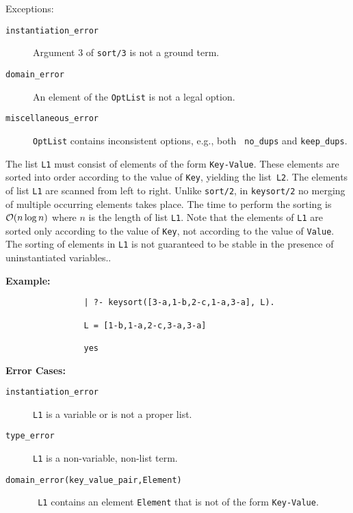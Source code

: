 \begin{description}
    Exceptions:
    \begin{description}
    \item[{\tt instantiation\_error}]
	Argument 3 of {\tt sort/3} is not a ground term.
    \item[{\tt domain\_error}]
      An element of the {\tt OptList} is not a legal option.
    \item[{\tt miscellaneous\_error}]
      {\tt OptList} contains inconsistent options, e.g., both {\tt
        no\_dups} and {\tt keep\_dups}.
    \end{description}

%
The list {\tt L1} must consist of elements of the form
\verb'Key-Value'.  These elements are sorted into order according to
the value of {\tt Key}, yielding the list~{\tt L2}.  The elements of
list {\tt L1} are scanned from left to right.  Unlike {\tt sort/2}, in
{\tt keysort/2} no merging of multiple occurring elements takes place.
The time to perform the sorting is ${\cal O}(n \log n)$ where $n$ is the
length of list {\tt L1}.  Note that the elements of {\tt L1} are
sorted only according to the value of {\tt Key}, not according to the
value of {\tt Value}.  The sorting of elements in {\tt L1} is not
guaranteed to be stable in the presence of uninstantiated variables..

{\bf    Example:}
    {\footnotesize
     \begin{verbatim}
                | ?- keysort([3-a,1-b,2-c,1-a,3-a], L).

                L = [1-b,1-a,2-c,3-a,3-a]

                yes
     \end{verbatim}}
{\bf Error Cases:}
\begin{description} 
\item[{\tt instantiation\_error}]
     {\tt L1} is a variable or is not a proper
     list.  
\item[{\tt type\_error}]
     {\tt L1} is a non-variable, non-list term.
\item[{\tt domain\_error(key\_value\_pair,Element)}] {\tt
     L1} contains an element {\tt Element} that is not of the
     form \verb'Key-Value'.  
\end{description}


\end{description}
